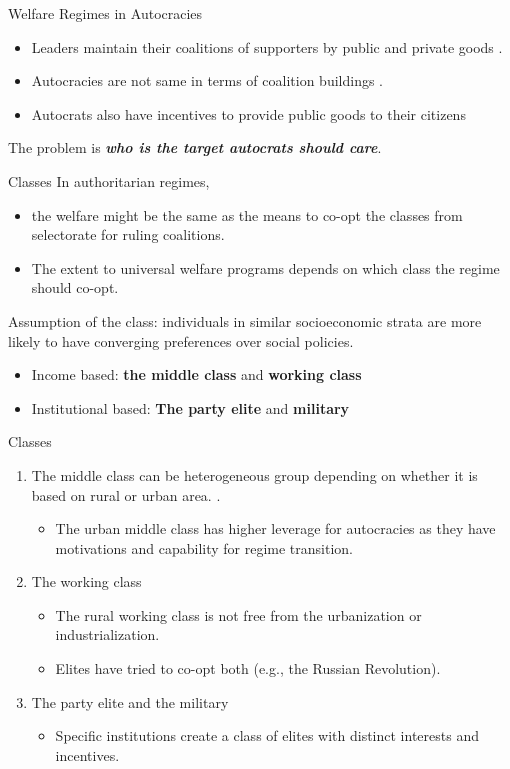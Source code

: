 \documentclass{Bredelebeamer}
\begin{document}
\begin{frame}{Welfare Regimes in Autocracies}
\begin{itemize}
	\item Leaders maintain their coalitions of supporters by public and private goods \citep{BuenodeMesquita2003}.
	\item Autocracies are not same in terms of coalition buildings \citep{Gandhi2009,Levitsky2010}.
	\item Autocrats also have incentives to provide public goods to their citizens \citep{Wintrobe1998}
\end{itemize}
\vspace{0.3in}
The problem is \textbf{\textit{who is the target autocrats should care}}. \centering 
\end{frame}

\begin{frame}{Classes}
In authoritarian regimes,
	\begin{itemize}
		\item the welfare might be the same as the means to co-opt the classes from selectorate for ruling coalitions.
		\item The extent to universal welfare programs depends on which class the regime should co-opt.
	\end{itemize}
Assumption of the class: individuals in similar socioeconomic strata are more likely to have converging preferences over social policies.
	\begin{itemize}
		\item Income based: \textbf{the middle class} and \textbf{working class}
		\item Institutional based: \textbf{The party elite} and \textbf{military}
		\end{itemize}
\end{frame}

\begin{frame}{Classes}
\begin{enumerate}
	\item The middle class can be heterogeneous group depending on whether it is based on rural or urban area. \citep{Dahlum2019}.
	\begin{itemize}
		\item The urban middle class has higher leverage for autocracies as they have motivations and capability for regime transition.
	\end{itemize}
	\item The working class
	\begin{itemize}
		\item The rural working class is not free from the urbanization or industrialization.
		\item Elites have tried to co-opt both (e.g., the Russian Revolution).
	\end{itemize}
	\item The party elite and the military
	\begin{itemize}
		\item Specific institutions create a class of elites with distinct interests and incentives.
	\end{itemize}
\end{enumerate}
\end{frame}
\end{document}
